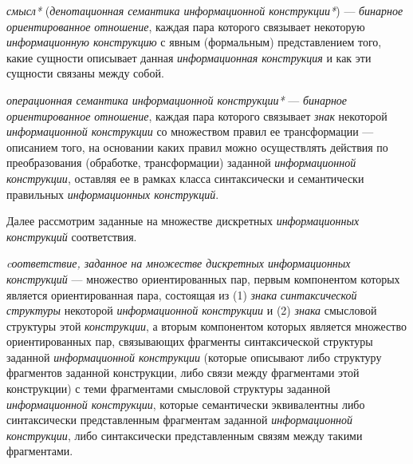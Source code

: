 \textit{смысл*} (\textit{денотационная семантика информационной конструкции*}) --- \textit{бинарное ориентированное отношение}, каждая пара которого связывает некоторую \textit{информационную конструкцию} с явным (формальным) представлением того, какие сущности описывает данная \textit{информационная конструкция} и как эти сущности связаны между собой.

\textit{операционная семантика информационной конструкции*} --- \textit{бинарное ориентированное отношение}, каждая пара которого связывает \textit{знак} некоторой \textit{информационной конструкции} со множеством правил ее трансформации --- описанием того, на основании каких правил можно осуществлять действия по преобразования (обработке, трансформации) заданной \textit{информационной конструкции}, оставляя ее в рамках класса синтаксически и семантически правильных \textit{информационных конструкций}.

\begin{SCn}


\end{SCn}

Далее рассмотрим заданные на множестве дискретных \textit{информационных конструкций} соответствия.

\begin{SCn}

    \begin{scnindent}
    \end{scnindent}

\end{SCn}

\textit{cоответствие, заданное на множестве дискретных информационных конструкций} --- множество ориентированных пар, первым компонентом которых является ориентированная пара, состоящая из (1) \textit{знака} \textit{синтаксической структуры} некоторой \textit{информационной конструкции} и (2) \textit{знака} смысловой структуры этой \textit{конструкции}, а вторым компонентом которых является множество ориентированных пар, связывающих фрагменты синтаксической структуры заданной \textit{информационной конструкции} (которые описывают либо структуру фрагментов заданной конструкции, либо связи между фрагментами этой конструкции) с теми фрагментами смысловой структуры заданной \textit{информационной конструкции}, которые семантически эквивалентны либо синтаксически представленным фрагментам заданной \textit{информационной конструкции}, либо синтаксически представленным связям между такими фрагментами.

